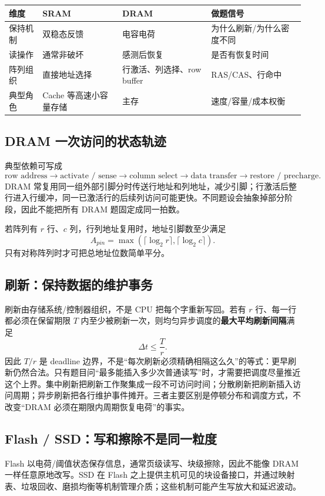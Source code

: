 \documentclass[UTF8,fontset=fandol,11pt,a4paper]{ctexart}
\begin{document}
\begin{center}\small
\begin{tabularx}{\linewidth}{L{2.2cm}YYY}
\toprule
维度 & SRAM & DRAM & 做题信号\\\midrule
保持机制 & 双稳态反馈 & 电容电荷 & 为什么刷新/为什么密度不同\\
读操作 & 通常非破坏 & 感测后恢复 & 是否有恢复时间\\
阵列组织 & 直接地址选择 & 行激活、列选择、row buffer & RAS/CAS、行命中\\
典型角色 & Cache 等高速小容量存储 & 主存 & 速度/容量/成本权衡\\
\bottomrule
\end{tabularx}
\end{center}

\subsection{DRAM 一次访问的状态轨迹}
典型依赖可写成
\[
\text{row address}
\to\text{activate / sense}
\to\text{column select}
\to\text{data transfer}
\to\text{restore / precharge}.
\]
DRAM 常复用同一组外部引脚分时传送行地址和列地址，减少引脚；行激活后整行进入行缓冲，同一已激活行的后续列访问可能更快。不同题设会抽象掉部分阶段，因此不能把所有 DRAM 题固定成同一拍数。

若阵列有 $r$ 行、$c$ 列，行列地址复用时，地址引脚数至少满足
\[
A_{pin}=\max\!\left(\lceil\log_2r\rceil,\lceil\log_2c\rceil\right).
\]
只有对称阵列时才可把总地址位数简单平分。

\subsection{刷新：保持数据的维护事务}
刷新由存储系统/控制器组织，不是 CPU 把每个字重新写回。若有 $r$ 行、每一行都必须在保留期限 $T$ 内至少被刷新一次，则均匀异步调度的\textbf{最大平均刷新间隔}满足
\[
\Delta t\le \frac{T}{r}.
\]
因此 $T/r$ 是 deadline 边界，不是“每次刷新必须精确相隔这么久”的等式：更早刷新仍然合法。只有题目问“最多能插入多少次普通读写”时，才需要把调度尽量推近这个上界。集中刷新把刷新工作聚集成一段不可访问时间；分散刷新把刷新插入访问周期；异步刷新把各行维护事件摊开。三者主要区别是停顿分布和调度方式，不改变“DRAM 必须在期限内周期恢复电荷”的事实。

\subsection{Flash / SSD：写和擦除不是同一粒度}
Flash 以电荷/阈值状态保存信息，通常页级读写、块级擦除，因此不能像 DRAM 一样任意原地改写。SSD 在 Flash 之上提供主机可见的块设备接口，并通过映射表、垃圾回收、磨损均衡等机制管理介质；这些机制可能产生写放大和延迟波动。
\end{document}
